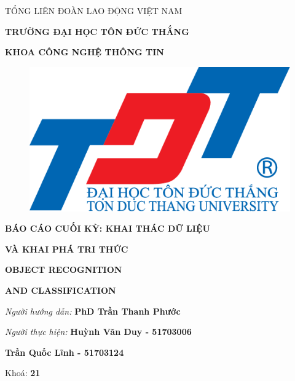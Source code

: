 \documentclass{report}
\begin{document}
\newcommand{\xfill}[2][1ex]{{%
  \dimen0=#2\advance\dimen0 by #1
  \leaders\hrule height \dimen0 depth -#1\hfill%
}}

\changefontsizes[14pt]{12pt}
\centerline{TỔNG LIÊN ĐOÀN LAO ĐỘNG VIỆT NAM}

\changefontsizes[14pt]{11pt}
\centerline{\textbf{TRƯỜNG ĐẠI HỌC TÔN ĐỨC THẮNG}}
\centerline{\textbf{KHOA CÔNG NGHỆ THÔNG TIN}}

\begin{center}
    \begin{figure}[htp]
    \begin{center}
     \includegraphics[scale=.2]{logo}
    \end{center}
    \end{figure}
\end{center}

\changefontsizes{16pt}
\centerline{\textbf{BÁO CÁO CUỐI KỲ: KHAI THÁC DỮ LIỆU}}

\centerline{\textbf{VÀ KHAI PHÁ TRI THỨC}}
\vspace{1.5cm}
\changefontsizes{24pt}
\centerline{\textbf{OBJECT RECOGNITION}}

\centerline{\textbf{AND CLASSIFICATION}}

\vspace{3.5cm}
\begin{flushright}
\renewcommand{\baselinestretch}{0.05}
\changefontsizes{14pt}
\textit{Người hướng dẫn: }\textbf{PhD Trần Thanh Phước}
\setlength{\parskip}{0.5em}

\textit{Người thực hiện: }\textbf{Huỳnh Văn Duy - 51703006}

\textbf{Trần Quốc Lĩnh - 51703124}
\setlength{\parskip}{0.5em}


Khoá: \textbf{21}
\setlength{\parskip}{0.5em}

\end{flushright}
\end{document}
